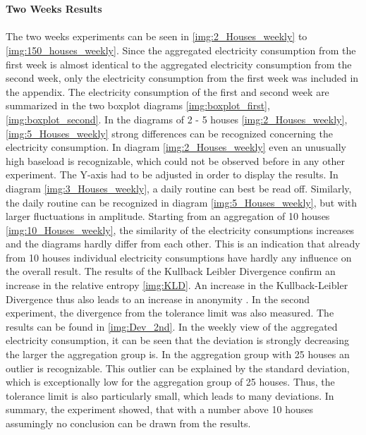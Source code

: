\\
\\
\textbf{Two Weeks Results}
\\
\\
The two weeks experiments can be seen in \ref{img:2_Houses_weekly} to \ref{img:150_houses_weekly}. Since the aggregated electricity consumption from the first week is almost identical to the aggregated electricity consumption from the second week, only the electricity consumption from the first week was included in the appendix. The electricity consumption of the first and second week are summarized in the two boxplot diagrams \ref{img:boxplot_first}, \ref{img:boxplot_second}.
In the diagrams of 2 - 5 houses \ref{img:2_Houses_weekly}, \ref{img:5_Houses_weekly} strong differences can be recognized concerning the electricity consumption.
In diagram \ref{img:2_Houses_weekly} even an unusually high baseload is recognizable, which could not be observed before in any other experiment. The Y-axis had to be adjusted in order to display the results. In diagram \ref{img:3_Houses_weekly}, a daily routine can best be read off. Similarly, the daily routine can be recognized in diagram \ref{img:5_Houses_weekly}, but with larger fluctuations in amplitude. Starting from an aggregation of 10 houses \ref{img:10_Houses_weekly}, the similarity of the electricity consumptions increases and the diagrams hardly differ from each other. This is an indication that already from 10 houses individual electricity consumptions have hardly any influence on the overall result. The results of the Kullback Leibler Divergence confirm an increase in the relative entropy \ref{img:KLD}. An increase in the Kullback-Leibler Divergence thus also leads to an increase in anonymity \cite{kalogridis2010privacy}.
In the second experiment, the divergence from the tolerance limit was also measured. The results can be found in \ref{img:Dev_2nd}. In the weekly view of the aggregated electricity consumption, it can be seen that the deviation is strongly decreasing the larger the aggregation group is. In the aggregation group with 25 houses an outlier is recognizable. This outlier can be explained by the standard deviation, which is exceptionally  low for the aggregation group of 25 houses. Thus, the tolerance limit is also particularly small, which leads to many deviations. In summary, the experiment showed, that with a number above 10 houses assumingly no conclusion can be drawn from the results.


\clearpage

